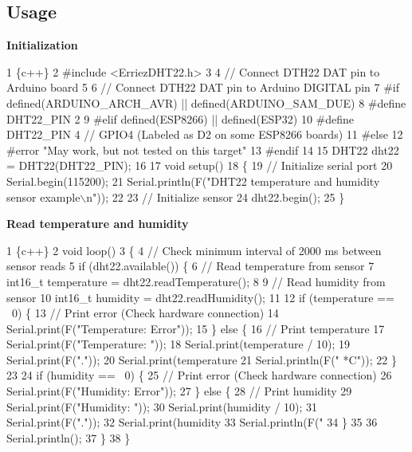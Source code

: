 \subsection*{Usage}

{\bfseries Initialization}


\begin{DoxyCode}
1 \{c++\}
2 #include <ErriezDHT22.h>
3 
4 // Connect DTH22 DAT pin to Arduino board
5 
6 // Connect DTH22 DAT pin to Arduino DIGITAL pin
7 #if defined(ARDUINO\_ARCH\_AVR) || defined(ARDUINO\_SAM\_DUE)
8 #define DHT22\_PIN      2
9 #elif defined(ESP8266) || defined(ESP32)
10 #define DHT22\_PIN      4 // GPIO4 (Labeled as D2 on some ESP8266 boards)
11 #else
12 #error "May work, but not tested on this target"
13 #endif
14 
15 DHT22 dht22 = DHT22(DHT22\_PIN);
16 
17 void setup()
18 \{
19     // Initialize serial port
20     Serial.begin(115200);
21     Serial.println(F("DHT22 temperature and humidity sensor example\(\backslash\)n"));
22 
23     // Initialize sensor
24     dht22.begin();
25 \}
\end{DoxyCode}


{\bfseries Read temperature and humidity}


\begin{DoxyCode}
1 \{c++\}
2 void loop()
3 \{
4     // Check minimum interval of 2000 ms between sensor reads
5     if (dht22.available()) \{
6         // Read temperature from sensor
7         int16\_t temperature = dht22.readTemperature();
8 
9         // Read humidity from sensor
10         int16\_t humidity = dht22.readHumidity();
11 
12         if (temperature == ~0) \{
13             // Print error (Check hardware connection)
14             Serial.print(F("Temperature: Error"));
15         \} else \{
16             // Print temperature
17             Serial.print(F("Temperature: "));
18             Serial.print(temperature / 10);
19             Serial.print(F("."));
20             Serial.print(temperature %
21             Serial.println(F(" *C"));
22         \}
23 
24         if (humidity == ~0) \{
25             // Print error (Check hardware connection)
26             Serial.print(F("Humidity: Error"));
27         \} else \{
28             // Print humidity
29             Serial.print(F("Humidity: "));
30             Serial.print(humidity / 10);
31             Serial.print(F("."));
32             Serial.print(humidity %
33             Serial.println(F(" %
34         \}
35 
36         Serial.println();
37       \}
38 \}
\end{DoxyCode}


